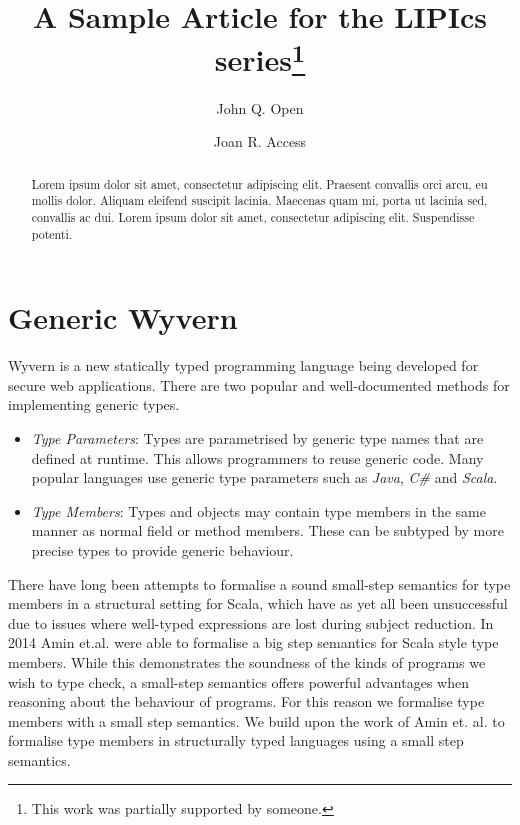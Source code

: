 \documentclass[a4paper,UKenglish]{lipics}
\title{A Sample Article for the LIPIcs series\footnote{This work was partially supported by someone.}}
\author[1]{John Q. Open}
\author[2]{Joan R. Access}
\affil[1]{Dummy University Computing Laboratory\\
  Address, Country\\
  \texttt{open@dummyuni.org}}
\affil[2]{Department of Informatics, Dummy College\\
  Address, Country\\
  \texttt{access@dummycollege.org}}
\begin{document}
\maketitle

\begin{abstract}
Lorem ipsum dolor sit amet, consectetur adipiscing elit. Praesent convallis orci arcu, eu mollis dolor. Aliquam eleifend suscipit lacinia. Maecenas quam mi, porta ut lacinia sed, convallis ac dui. Lorem ipsum dolor sit amet, consectetur adipiscing elit. Suspendisse potenti. 
 \end{abstract}


\section{Generic Wyvern}
Wyvern is a new statically typed programming language being developed for secure web applications. There are two popular and well-documented methods \cite{Virtual Types stuff, generic java etc} for implementing generic types.
\begin{itemize}
\item \emph{Type Parameters}: Types are parametrised by generic type names that are defined at runtime. This allows programmers to reuse generic code. Many popular languages use generic type parameters such as \emph{Java}, \emph{C\#} and \emph{Scala}.
\item \emph{Type Members}: Types and objects may contain type members in the same manner as normal field or method members. These can be subtyped by more precise types to provide generic behaviour.
\end{itemize}
There have long been attempts to formalise a sound small-step semantics for type members in a structural setting for Scala, which have as yet all been unsuccessful due to issues where well-typed expressions are lost during subject reduction. In 2014 Amin et.al. were able to formalise a big step semantics for Scala style type members. While this demonstrates the soundness of the kinds of programs we wish to type check, a small-step semantics offers powerful advantages when reasoning about the behaviour of programs. For this reason we formalise type members with a small step semantics.
We build upon the work of Amin et. al. \cite{Scala stuff} to formalise type members in structurally typed languages using a small step semantics. 
\end{document}
